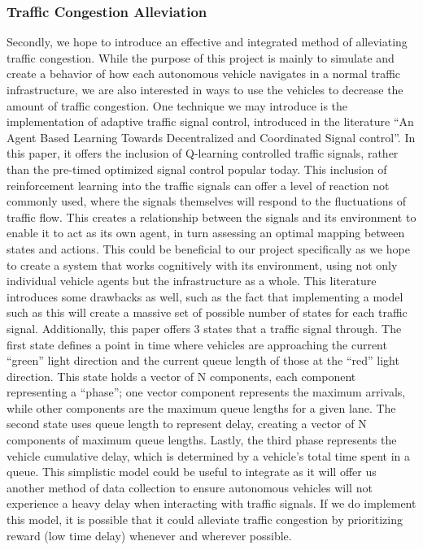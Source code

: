 \documentclass[onecolumn, draftclsnofoot,10pt, compsoc]{IEEEtran}
\begin{document}
\subsubsection{Traffic Congestion Alleviation}
Secondly, we hope to introduce an effective and integrated method of alleviating traffic congestion.
While the purpose of this project is mainly to simulate and create a behavior of how each autonomous vehicle navigates in a normal traffic infrastructure, we are also interested in ways to use the vehicles to decrease the amount of traffic congestion.
One technique we may introduce is the implementation of adaptive traffic signal control, introduced in the literature “An Agent Based Learning Towards Decentralized and Coordinated Signal control”.
In this paper, it offers the inclusion of Q-learning controlled traffic signals, rather than the pre-timed optimized signal control popular today.
This inclusion of reinforcement learning into the traffic signals can offer a level of reaction not commonly used, where the signals themselves will respond to the fluctuations of traffic flow.
This creates a relationship between the signals and its environment to enable it to act as its own agent, in turn assessing an optimal mapping between states and actions.
This could be beneficial to our project specifically as we hope to create a system that works cognitively with its environment, using not only individual vehicle agents but the infrastructure as a whole.
This literature introduces some drawbacks as well, such as the fact that implementing a model such as this will create a massive set of possible number of states for each traffic signal.
Additionally, this paper offers 3 states that a traffic signal through.
The first state defines a point in time where vehicles are approaching the current “green” light direction and the current queue length of those at the “red” light direction.
This state holds a vector of N components, each component representing a “phase”; one vector component represents the maximum arrivals, while other components are the maximum queue lengths for a given lane.
The second state uses queue length to represent delay, creating a vector of N components of maximum queue lengths.
Lastly, the third phase represents the vehicle cumulative delay, which is determined by a vehicle’s total time spent in a queue.
This simplistic model could be useful to integrate as it will offer us another method of data collection to ensure autonomous vehicles will not experience a heavy delay when interacting with traffic signals.
If we do implement this model, it is possible that it could alleviate traffic congestion by prioritizing reward (low time delay) whenever and wherever possible.
\end{document}
